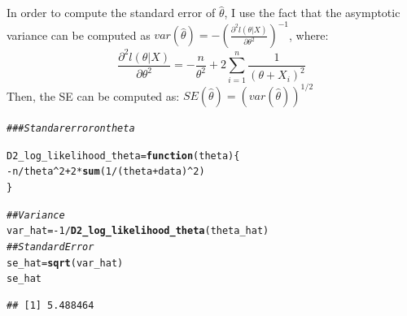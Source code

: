 \documentclass[11pt]{article}\usepackage[]{graphicx}\usepackage[]{color}
\makeatletter
\newcommand{\hlnum}[1]{\textcolor[rgb]{0.686,0.059,0.569}{#1}}%
\newcommand{\hlcom}[1]{\textcolor[rgb]{0.678,0.584,0.686}{\textit{#1}}}%
\newcommand{\hlopt}[1]{\textcolor[rgb]{0,0,0}{#1}}%
\newcommand{\hlstd}[1]{\textcolor[rgb]{0.345,0.345,0.345}{#1}}%
\newcommand{\hlkwa}[1]{\textcolor[rgb]{0.161,0.373,0.58}{\textbf{#1}}}%
\newcommand{\hlkwb}[1]{\textcolor[rgb]{0.69,0.353,0.396}{#1}}%
\newcommand{\hlkwc}[1]{\textcolor[rgb]{0.333,0.667,0.333}{#1}}%
\newcommand{\hlkwd}[1]{\textcolor[rgb]{0.737,0.353,0.396}{\textbf{#1}}}%
\newenvironment{kframe}{%
 \def\at@end@of@kframe{}%
 \ifinner\ifhmode%
  \def\at@end@of@kframe{\end{minipage}}%
  \begin{minipage}{\columnwidth}%
 \fi\fi%
 \def\FrameCommand##1{\hskip\@totalleftmargin \hskip-\fboxsep
 \colorbox{shadecolor}{##1}\hskip-\fboxsep
     \hskip-\linewidth \hskip-\@totalleftmargin \hskip\columnwidth}%
 \MakeFramed {\advance\hsize-\width
   \@totalleftmargin\z@ \linewidth\hsize
   \@setminipage}}%
 {\par\unskip\endMakeFramed%
 \at@end@of@kframe}
\newenvironment{knitrout}{}{} %
\makeatother
\begin{document}
\section{}
In order to compute the standard error of $\hat{\theta}$, I use the fact that the asymptotic variance can be computed as $var(\hat{\theta}) = -(\frac{\partial^2 l(\theta|X)}{\partial \theta^2})^{-1}$, where:
\begin{equation}
\frac{\partial^2 l(\theta|X)}{\partial \theta^2} = -\frac{n}{\theta^2}+2\sum_{i=1}^n\frac{1}{(\theta+X_i)^2}
\end{equation}
Then, the SE can be computed as: $SE(\hat{\theta}) = (var(\hat{\theta}))^{1/2}$
\begin{knitrout}
\color{fgcolor}\begin{kframe}
\begin{alltt}
\hlcom{## # Standar error on theta}

\hlstd{D2_log_likelihood_theta} \hlkwb{=} \hlkwa{function}\hlstd{(}\hlkwc{theta}\hlstd{)\{}
  \hlopt{-}\hlstd{n}\hlopt{/}\hlstd{theta}\hlopt{^}\hlnum{2}\hlopt{+}\hlnum{2}\hlopt{*}\hlkwd{sum}\hlstd{(}\hlnum{1}\hlopt{/}\hlstd{(theta}\hlopt{+}\hlstd{data)}\hlopt{^}\hlnum{2}\hlstd{)}
\hlstd{\}}

\hlcom{# # Variance}
\hlstd{var_hat} \hlkwb{=} \hlopt{-}\hlnum{1}\hlopt{/}\hlkwd{D2_log_likelihood_theta}\hlstd{(theta_hat)}
\hlcom{# # Standard Error}
\hlstd{se_hat} \hlkwb{=} \hlkwd{sqrt}\hlstd{(var_hat)}
\hlstd{se_hat}
\end{alltt}
\begin{verbatim}
## [1] 5.488464
\end{verbatim}
\end{kframe}
\end{knitrout}
\end{document}
